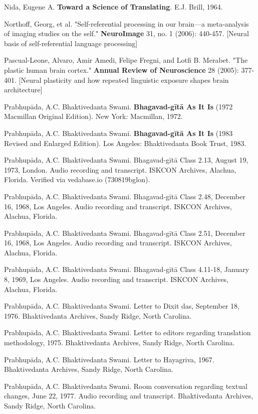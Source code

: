 \documentclass[12pt,twoside]{book}
\begin{document}
Nida, Eugene A. \textbf{Toward a Science of Translating}. E.J. Brill, 1964.

Northoff, Georg, et al. "Self-referential processing in our brain—a meta-analysis of imaging studies on the self." \textbf{NeuroImage} 31, no. 1 (2006): 440-457. [Neural basis of self-referential language processing]

Pascual-Leone, Alvaro, Amir Amedi, Felipe Fregni, and Lotfi B. Merabet. "The plastic human brain cortex." \textbf{Annual Review of Neuroscience} 28 (2005): 377-401. [Neural plasticity and how repeated linguistic exposure shapes brain architecture]

Prabhupāda, A.C. Bhaktivedanta Swami. \textbf{Bhagavad-gītā As It Is} (1972 Macmillan Original Edition). New York: Macmillan, 1972.

Prabhupāda, A.C. Bhaktivedanta Swami. \textbf{Bhagavad-gītā As It Is} (1983 Revised and Enlarged Edition). Los Angeles: Bhaktivedanta Book Trust, 1983.

Prabhupāda, A.C. Bhaktivedanta Swami. Bhagavad-gītā Class 2.13, August 19, 1973, London. Audio recording and transcript. ISKCON Archives, Alachua, Florida. Verified via vedabase.io (730819bglon).

Prabhupāda, A.C. Bhaktivedanta Swami. Bhagavad-gītā Class 2.48, December 16, 1968, Los Angeles. Audio recording and transcript. ISKCON Archives, Alachua, Florida.

Prabhupāda, A.C. Bhaktivedanta Swami. Bhagavad-gītā Class 2.51, December 16, 1968, Los Angeles. Audio recording and transcript. ISKCON Archives, Alachua, Florida.

Prabhupāda, A.C. Bhaktivedanta Swami. Bhagavad-gītā Class 4.11-18, January 8, 1969, Los Angeles. Audio recording and transcript. ISKCON Archives, Alachua, Florida.

Prabhupāda, A.C. Bhaktivedanta Swami. Letter to Dixit das, September 18, 1976. Bhaktivedanta Archives, Sandy Ridge, North Carolina.

Prabhupāda, A.C. Bhaktivedanta Swami. Letter to editors regarding translation methodology, 1975. Bhaktivedanta Archives, Sandy Ridge, North Carolina.

Prabhupāda, A.C. Bhaktivedanta Swami. Letter to Hayagriva, 1967. Bhaktivedanta Archives, Sandy Ridge, North Carolina.

Prabhupāda, A.C. Bhaktivedanta Swami. Room conversation regarding textual changes, June 22, 1977. Audio recording and transcript. Bhaktivedanta Archives, Sandy Ridge, North Carolina.
\end{document}
